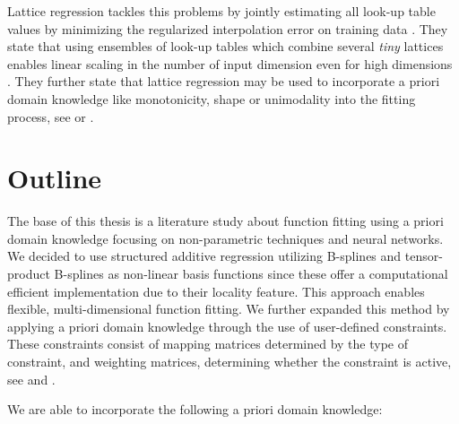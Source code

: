 Lattice regression tackles this problems by jointly estimating all look-up table values by minimizing the regularized interpolation error on training data \cite{garcia2009lattice}. They state that using ensembles of look-up tables which combine several \emph{tiny} lattices enables linear scaling in the number of input dimension even for high dimensions \cite{fard2016fast}. They further state that lattice regression may be used to incorporate a priori domain knowledge like monotonicity, shape or unimodality into the fitting process, see \cite{gupta2016monotonic} or \cite{you2017deep}.

\section{Outline}

The base of this thesis is a literature study about function fitting using a priori domain knowledge focusing on non-parametric techniques and neural networks. We decided to use structured additive regression \cite{fahrmeir2007regression} utilizing B-splines and tensor-product B-splines as non-linear basis functions since these offer a computational efficient implementation due to their locality feature. This approach enables flexible, multi-dimensional function fitting. We further expanded this method by applying a priori domain knowledge through the use of user-defined constraints. These constraints consist of mapping matrices determined by the type of constraint, and weighting matrices, determining whether the constraint is active, see \cite{hofner2011monotonicity} and \cite{bollaerts2006simple}.

We are able to incorporate the following a priori domain knowledge: 

